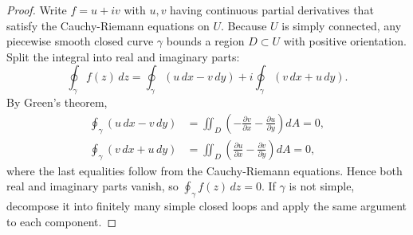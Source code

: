 \begin{proof}
  Write $f = u + i v$ with $u, v$ having continuous partial derivatives that satisfy the Cauchy-Riemann equations on $U$.
  Because $U$ is simply connected, any piecewise smooth closed curve $\gamma$ bounds a region $D \subset U$ with positive orientation.
  Split the integral into real and imaginary parts:
  \[
    \oint_{\gamma} f(z) \, dz = \oint_{\gamma} (u \, dx - v \, dy) + i \oint_{\gamma} (v \, dx + u \, dy).
  \]
  By Green's theorem,
  \begin{align*}
    \oint_{\gamma} (u \, dx - v \, dy) & = \iint_{D} \left( -\frac{\partial v}{\partial x} - \frac{\partial u}{\partial y} \right) dA = 0, \\
    \oint_{\gamma} (v \, dx + u \, dy) & = \iint_{D} \left( \frac{\partial u}{\partial x} - \frac{\partial v}{\partial y} \right) dA = 0,
  \end{align*}
  where the last equalities follow from the Cauchy-Riemann equations.
  Hence both real and imaginary parts vanish, so $\oint_{\gamma} f(z) \, dz = 0$.
  If $\gamma$ is not simple, decompose it into finitely many simple closed loops and apply the same argument to each component.
\end{proof}

